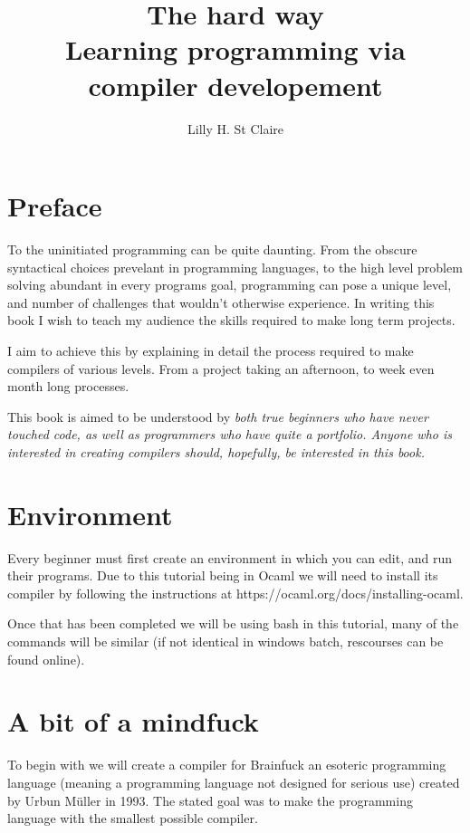\documentclass[12pt]{article}
\begin{document}
\title{
    The hard way \\
    \large Learning programming via compiler developement
}
\author{Lilly H. St Claire}
\maketitle
\pagebreak
\tableofcontents
\pagebreak

\section{Preface}

To the uninitiated programming can be quite daunting.
From the obscure syntactical choices prevelant in
programming languages, to the high level problem
solving abundant in every programs goal, programming
can pose a unique level, and number of challenges
that wouldn't otherwise experience. In writing this
book I wish to teach my audience the skills required
to make long term projects.

I aim to achieve this by explaining in detail the
process required to make compilers of various levels.
From a project taking an afternoon, to week even
month long processes.

This book is aimed to be understood by \it both \rm
true beginners who have never touched code, as well
as programmers who have quite a portfolio. Anyone
who is interested in creating compilers should,
hopefully, be interested in this book.

\section{Environment}

Every beginner must first create an environment in which
you can edit, and run their programs. Due to this tutorial
being in Ocaml we will need to install its compiler by
following the instructions at
https://ocaml.org/docs/installing-ocaml.

Once that has been completed we will be using bash in this
tutorial, many of the commands will be similar (if not
identical in windows batch, rescourses can be found online).

\section{A bit of a mindfuck}

To begin with we will create a compiler for Brainfuck
an esoteric programming language (meaning a programming
language not designed for serious use) created by
Urbun M\"uller in 1993. The stated goal was to make the
programming language with the smallest possible compiler.
\end{document}
